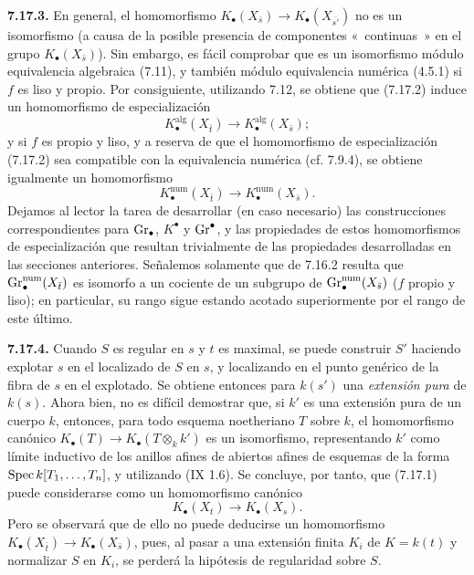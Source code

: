 \textbf{7.17.3.} En general, el homomorfismo \(K_\bullet(X_{\bar s})\to K_\bullet(X_{\overline{s'}})\) no es un isomorfismo (a causa de la posible presencia de componentes «~continuas~» en el grupo \(K_\bullet(X_{\bar s})\)). Sin embargo, es fácil comprobar que es un isomorfismo módulo equivalencia algebraica (7.11), y también módulo equivalencia numérica (4.5.1) si \(f\) es liso y propio. Por consiguiente, utilizando 7.12, se obtiene que (7.17.2) induce un homomorfismo de especialización
\begin{equation}\tag{7.17.3.1}
  K_\bullet^{\mathrm{alg}}(X_{\bar t})\longrightarrow
  K_\bullet^{\mathrm{alg}}(X_{\bar s});
\end{equation}
y si \(f\) es propio y liso, y a reserva de que el homomorfismo de especialización (7.17.2) sea compatible con la equivalencia numérica (cf. 7.9.4), se obtiene igualmente un homomorfismo
\begin{equation}\tag{7.17.3.2}
  K_\bullet^{\mathrm{num}}(X_{\bar t})\longrightarrow
  K_\bullet^{\mathrm{num}}(X_{\bar s}).
\end{equation}
Dejamos al lector la tarea de desarrollar (en caso necesario) las construcciones correspondientes para \(\operatorname{Gr}_\bullet\), \(K^\bullet\) y \(\operatorname{Gr}^\bullet\), y las propiedades de estos homomorfismos de especialización que resultan trivialmente de las propiedades desarrolladas en las secciones anteriores. Señalemos solamente que de 7.16.2 resulta que \(\operatorname{Gr}_\bullet^{\mathrm{num}}(X_{\bar t})\) es isomorfo a un cociente de un subgrupo de \(\operatorname{Gr}_\bullet^{\mathrm{num}}(X_{\bar s})\) (\(f\) propio y liso); en particular, su rango sigue estando acotado superiormente por el rango de este último.

\textbf{7.17.4.} Cuando \(S\) es regular en \(s\) y \(t\) es maximal, se puede construir \(S'\) haciendo explotar \(s\) en el localizado de \(S\) en \(s\), y localizando en el punto genérico de la fibra de \(s\) en el explotado. Se obtiene entonces para \(k(s')\) una \emph{extensión pura} de \(k(s)\). Ahora bien, no es difícil demostrar que, si \(k'\) es una extensión pura de un cuerpo \(k\), entonces, para todo esquema noetheriano \(T\) sobre \(k\), el homomorfismo canónico \(K_\bullet(T)\to K_\bullet(T\otimes_k k')\) es un isomorfismo, representando \(k'\) como límite inductivo de los anillos afines de abiertos afines de esquemas de la forma \(\operatorname{Spec} k[T_1,\ldots,T_n]\), y utilizando (IX 1.6). Se concluye, por tanto, que (7.17.1) puede considerarse como un homomorfismo canónico
\begin{equation}\tag{7.17.4.1}
  K_\bullet(X_t)\longrightarrow K_\bullet(X_s).
\end{equation}
Pero se observará que de ello no puede deducirse un homomorfismo \(K_\bullet(X_{\bar t})\to K_\bullet(X_{\bar s})\), pues, al pasar a una extensión finita \(K_i\) de \(K=k(t)\) y normalizar \(S\) en \(K_i\), se perderá la hipótesis de regularidad sobre \(S\).

